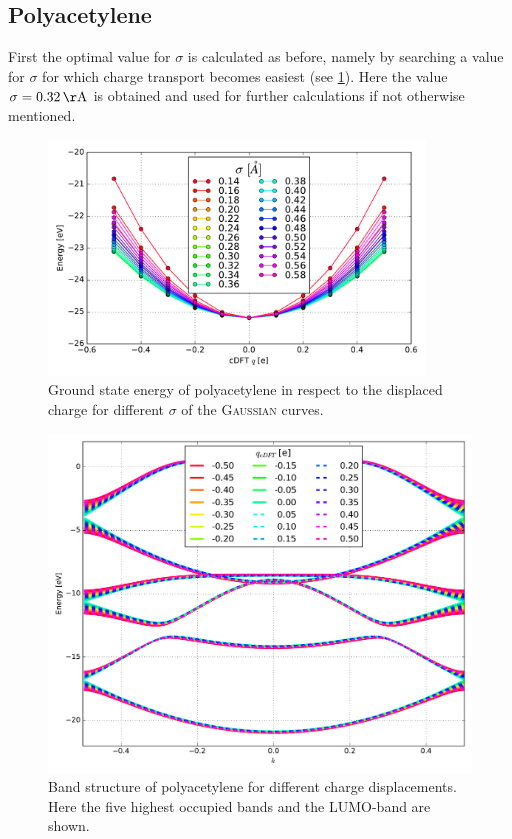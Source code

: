 \subsection{Polyacetylene}
First the optimal value for $\sigma$ is calculated as before, namely by searching a value for $\sigma$ for which charge transport becomes easiest (see \cref{image_sigmas_polyacetylene}). Here the value $\sigma = \unit[0.32]{\AA}$ is obtained and used for further calculations if not otherwise mentioned.\\
\begin{figure}
	\centering
	\includegraphics[width = 10cm]{Images/polyacetylene/charging/sigmas}
	\caption{Ground state energy of polyacetylene in respect to the displaced charge for different $\sigma$ of the \textsc{Gaussian} curves.}
	\label{image_sigmas_polyacetylene}
\end{figure}




\newpage
\begin{figure}
	\centering
	\includegraphics[width = 13cm]{Images/polyacetylene/charging/band_structure_q_1}
	\caption{Band structure of polyacetylene for different charge displacements. Here the five highest occupied bands and the LUMO-band are shown.}
	\label{}
\end{figure}

